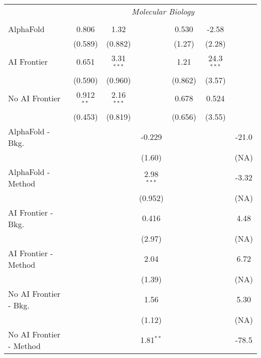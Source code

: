 \begin{tabular}{lcccccc}
 & \multicolumn{6}{c}{\textit{Molecular Biology}} \\ \\
   AlphaFold               & 0.806        & 1.32         &              & 0.530   & -2.58        &   \\   
                           & (0.589)      & (0.882)      &              & (1.27)  & (2.28)       &   \\   
   AI Frontier             & 0.651        & 3.31$^{***}$ &              & 1.21    & 24.3$^{***}$ &   \\   
                           & (0.590)      & (0.960)      &              & (0.862) & (3.57)       &   \\   
   No AI Frontier          & 0.912$^{**}$ & 2.16$^{***}$ &              & 0.678   & 0.524        &   \\   
                           & (0.453)      & (0.819)      &              & (0.656) & (3.55)       &   \\   
   AlphaFold - Bkg.        &              &              & -0.229       &         &              & -21.0\\   
                           &              &              & (1.60)       &         &              & (NA)\\   
   AlphaFold - Method      &              &              & 2.98$^{***}$ &         &              & -3.32\\   
                           &              &              & (0.952)      &         &              & (NA)\\   
   AI Frontier - Bkg.      &              &              & 0.416        &         &              & 4.48\\   
                           &              &              & (2.97)       &         &              & (NA)\\   
   AI Frontier - Method    &              &              & 2.04         &         &              & 6.72\\   
                           &              &              & (1.39)       &         &              & (NA)\\   
   No AI Frontier - Bkg.   &              &              & 1.56         &         &              & 5.30\\   
                           &              &              & (1.12)       &         &              & (NA)\\   
   No AI Frontier - Method &              &              & 1.81$^{**}$  &         &              & -78.5\\   

\end{tabular}
